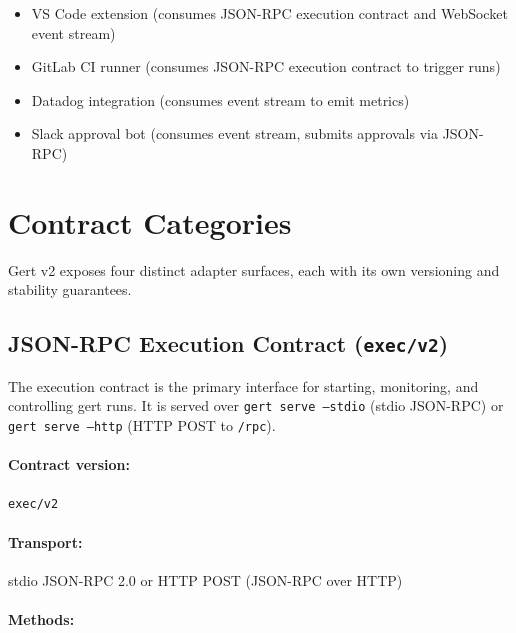 \begin{itemize}
  \item VS Code extension (consumes JSON-RPC execution contract and WebSocket
        event stream)~\cite{vscode-extension-api}
  \item GitLab CI runner (consumes JSON-RPC execution contract to trigger runs)
  \item Datadog integration (consumes event stream to emit metrics)
  \item Slack approval bot (consumes event stream, submits approvals via
        JSON-RPC)
\end{itemize}

\section{Contract Categories}
\label{sec:contract-categories}

Gert v2 exposes four distinct adapter surfaces, each with its own versioning
and stability guarantees.

\subsection{JSON-RPC Execution Contract (\texttt{exec/v2})}
\label{sec:jsonrpc-exec-contract}

The execution contract is the primary interface for starting, monitoring, and
controlling gert runs.  It is served over \texttt{gert serve --stdio} (stdio
JSON-RPC) or \texttt{gert serve --http} (HTTP POST to \texttt{/rpc}).

\paragraph{Contract version:} \texttt{exec/v2}

\paragraph{Transport:} stdio JSON-RPC 2.0 or HTTP POST (JSON-RPC over HTTP)

\paragraph{Methods:}

